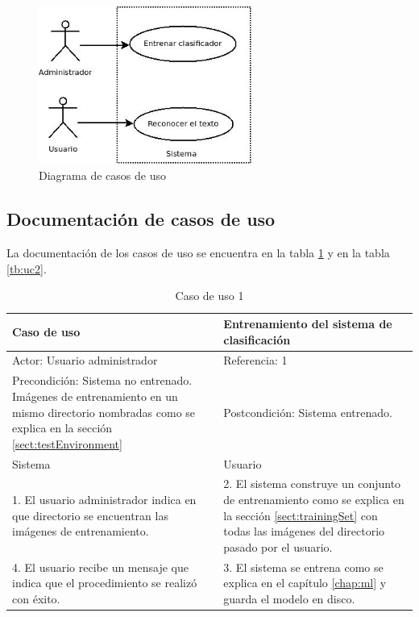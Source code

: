 \documentclass[a4paper, 11pt, oneside]{report}
\begin{document}
\begin{figure}[htb]
\begin{center}
\leavevmode
\includegraphics[width=7cm]{diagrams/casoUso.jpg}
\end{center}
\caption{Diagrama de casos de uso}
\label{fig:useCase}
\end{figure}

\subsection{Documentación de casos de uso}

La documentación de los casos de uso se encuentra en la tabla \ref{tb:uc1} y en la tabla \ref{tb:uc2}.

\begin{table}
\begin{center}
\begin{tabular}{|p{6cm}|p{6cm}|}
	\hline
	Caso de uso & Entrenamiento del sistema de clasificación\\
	\hline
	Actor: Usuario administrador & Referencia: 1 \\
	\hline
	Precondición: Sistema no entrenado. Imágenes de entrenamiento en un mismo directorio nombradas como se explica en la sección \ref{sect:testEnvironment} & 
	Postcondición: Sistema entrenado. \\
	\hline
	Sistema & Usuario \\
	\hline
	1. El usuario administrador indica en que directorio se encuentran las imágenes de entrenamiento. &
	2. El sistema construye un conjunto de entrenamiento como se explica en la sección \ref{sect:trainingSet} con todas las imágenes del directorio pasado por el usuario. \\
	\hline
	4. El usuario recibe un mensaje que indica que el procedimiento se realizó c\label{eq:hu}on éxito. &
	3. El sistema se entrena como se explica en el capítulo \ref{chap:ml} y guarda el modelo en disco. \\
	\hline
\end{tabular}
\end{center}
\caption{Caso de uso 1}	
\label{tb:uc1}
\end{table}
\end{document}
